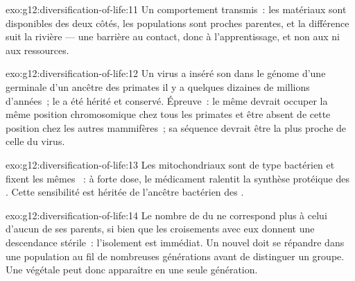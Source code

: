 \begin{solution}{exo:g12:diversification-of-life:11}
Un comportement transmis~: les matériaux sont disponibles des deux
côtés, les populations sont proches parentes, et la différence suit la
rivière --- une barrière au contact, donc à l'apprentissage, et non aux
 ni aux ressources.
\end{solution}

\begin{solution}{exo:g12:diversification-of-life:12}
Un virus a inséré son  dans le génome d'une  germinale d'un
ancêtre des primates il y a quelques dizaines de millions d'années~; le
 a été hérité et conservé. Épreuve~: le même  devrait occuper la
même position chromosomique chez tous les primates et être absent de
cette position chez les autres mammifères~; sa séquence devrait être la
plus proche de celle du virus.
\end{solution}

\begin{solution}{exo:g12:diversification-of-life:13}
Les  mitochondriaux sont de type bactérien et fixent les mêmes
~: à forte dose, le médicament ralentit la synthèse
protéique des . Cette sensibilité est héritée de l'ancêtre
bactérien des .
\end{solution}

\begin{solution}{exo:g12:diversification-of-life:14}
Le nombre de  du  ne correspond plus à celui
d'aucun de ses parents, si bien que les croisements avec eux donnent
une descendance stérile~: l'isolement est immédiat. Un nouvel 
doit se répandre dans une population au fil de nombreuses générations
avant de distinguer un groupe. Une  végétale peut donc apparaître
en une seule génération.
\end{solution}

